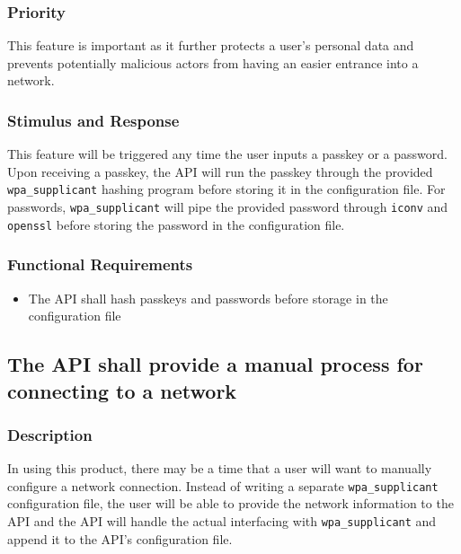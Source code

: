 \subsubsection{Priority}
This feature is important as it further protects a user's personal data and prevents
potentially malicious actors from having an easier entrance into a network.

\subsubsection{Stimulus and Response}
This feature will be triggered any time the user inputs a passkey or a password.
Upon receiving a passkey, the API will run the passkey through the provided 
\texttt{wpa\_supplicant} hashing program before storing it in the configuration file. For
passwords, \texttt{wpa\_supplicant} will pipe the provided password through \texttt{iconv} and \texttt{openssl}
before storing the password in the configuration file.

\subsubsection{Functional Requirements}
\begin{itemize}
  \item The API shall hash passkeys and passwords before storage in the configuration file
\end{itemize}


\subsection{The API shall provide a manual process for connecting to a network}
\subsubsection{Description}
In using this product, there may be a time that a user will want to manually configure
a network connection. Instead of writing a separate \texttt{wpa\_supplicant} configuration file,
the user will be able to provide the network information to the API and the API will handle
the actual interfacing with \texttt{wpa\_supplicant} and append it to the API's configuration file.

